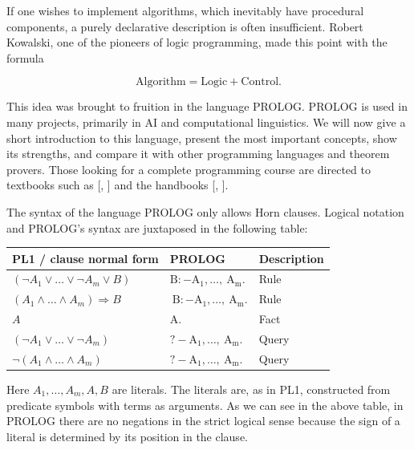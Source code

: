 \documentclass[10pt]{book}
\begin{document}
If one wishes to implement algorithms, which inevitably have procedural components, a purely declarative description is often insufficient. Robert Kowalski, one of the pioneers of logic programming, made this point with the formula

$$
\text{Algorithm}=\text{Logic}+\text{Control}.
$$

This idea was brought to fruition in the language PROLOG. PROLOG is used in many projects, primarily in AI and computational linguistics. We will now give a short introduction to this language, present the most important concepts, show its strengths, and compare it with other programming languages and theorem provers. Those looking for a complete programming course are directed to textbooks such as [\cite{bratko2011prolog}, \cite{clocksin1994prolog}] and the handbooks [\cite{wielemaker2004swipl}, \cite{diaz2004gnuprolog}].

The syntax of the language PROLOG only allows Horn clauses. Logical notation and PROLOG's syntax are juxtaposed in the following table:

\begin{center}
\begin{tabular}{lll}
\hline
PL1 / clause normal form & PROLOG & Description \\
\hline
$\left(\neg A_{1} \vee \ldots \vee \neg A_{m} \vee B\right)$ & $\mathrm{B}:-\mathrm{A}_{1}, \ldots, \mathrm{~A}_{\mathrm{m}}$. & Rule \\
\hline
$\left(A_{1} \wedge \ldots \wedge A_{m}\right) \Rightarrow B$ & $\mathrm{~B}:-\mathrm{A}_{1}, \ldots, \mathrm{~A}_{\mathrm{m}}$. & Rule \\
\hline
$A$ & A. & Fact \\
\hline
$\left(\neg A_{1} \vee \ldots \vee \neg A_{m}\right)$ & $?-\mathrm{A}_{1}, \ldots, \mathrm{~A}_{\mathrm{m}}$. & Query \\
\hline
$\neg\left(A_{1} \wedge \ldots \wedge A_{m}\right)$ & $?-\mathrm{A}_{1}, \ldots, \mathrm{~A}_{\mathrm{m}}$. & Query \\
\hline
\end{tabular}
\end{center}

Here $A_{1}, \ldots, A_{m}, A, B$ are literals. The literals are, as in PL1, constructed from predicate symbols with terms as arguments. As we can see in the above table, in PROLOG there are no negations in the strict logical sense because the sign of a literal is determined by its position in the clause.
\end{document}
